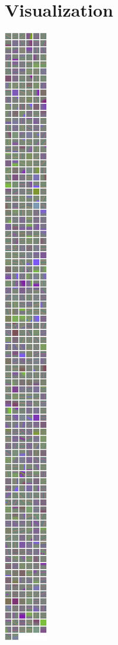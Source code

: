 \documentclass{article}
\begin{document}
\section{Visualization}
\begin{centering}
\includegraphics[scale=0.5]{images/centroids.png}
\end{centering}
\end{document}
